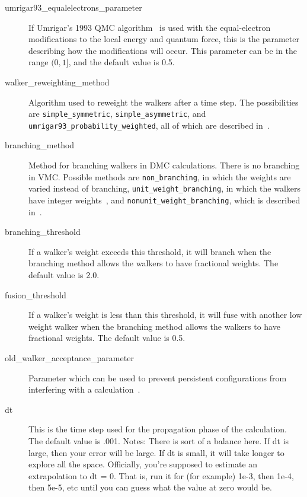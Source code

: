 \documentclass[11pt]{article}
\begin{document}
\begin{description}
\item [umrigar93\_equalelectrons\_parameter] If Umrigar's 1993 QMC
  algorithm~\cite{UmrigarNightingaleRunge1993} is used with the equal-electron
  modifications to the local energy and quantum force, this is the
  parameter describing how the modifications will occur.  This
  parameter can be in the range $(0,1]$, and the default value is 0.5.

\item [walker\_reweighting\_method] Algorithm used to reweight the
  walkers after a time step.  The possibilities are
  \verb-simple_symmetric-, \verb-simple_asymmetric-, and
  \verb-umrigar93_probability_weighted-, all of which are described
  in~\cite{UmrigarNightingaleRunge1993}. 

\item [branching\_method] Method for branching walkers in DMC
  calculations.  There is no branching in VMC.  Possible
  methods are \verb-non_branching-, in which the weights are varied
  instead of branching, \verb-unit_weight_branching-, in which the
  walkers have integer weights~\cite{H+L}, and
  \verb-nonunit_weight_branching-, which is described
  in~\cite{UmrigarNightingaleRunge1993}.   

\item [branching\_threshold] If a walker's weight exceeds this
  threshold, it will branch when the branching method allows the
  walkers to have fractional weights.  The default value is 2.0.

\item [fusion\_threshold] If a walker's weight is less than this
  threshold, it will fuse with another low weight walker when the
  branching method allows the walkers to have fractional weights.  The
  default value is 0.5.

\item [old\_walker\_acceptance\_parameter] Parameter which can be
  used to prevent persistent configurations from interfering with a
  calculation~\cite{UmrigarNightingaleRunge1993}.

\item [dt] This is the time step used for the propagation phase
  of the calculation.  The default value is .001. Notes: There is sort of a balance here. If dt                                                                                                                       
     is large, then your error will be large. If dt is small, it will take longer to explore all the                                                                                                                    
     space. Officially, you're supposed to estimate an extrapolation                                                                                                            
     to dt = 0. That is, run it for (for example) 1e-3,                                                                                                                  
     then 1e-4, then 5e-5, etc until you can guess what                                                                                                                  
     the value at zero would be.  


\end{description}
\end{document}
